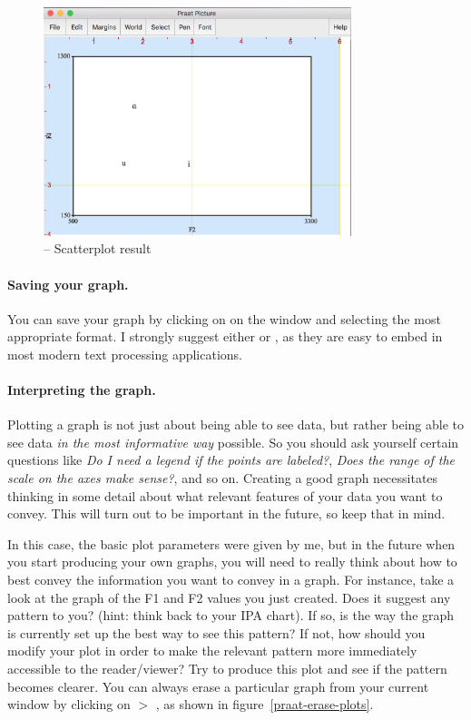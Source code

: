 \begin{figure}[!tbp]
\caption{\Praat{} -- Scatterplot result}
\label{praat-scatterplot-result}
	\begin{center}
		\includegraphics[width=0.8\textwidth]{./figures/Praat-16-Scatterplot-Output}
	\end{center}
\end{figure}

\paragraph{Saving your graph.} You can save your graph by clicking on  on the  window and selecting the most appropriate format. I strongly suggest either  or , as they are easy to embed in most modern text processing applications.

\paragraph{Interpreting the graph.} Plotting a graph is not just about being able to see data, but rather being able to see data \emph{in the most informative way} possible. So you should ask yourself certain questions like \emph{Do I need a legend if the points are labeled?}, \emph{Does the range of the scale on the axes make sense?}, and so on. Creating a good graph necessitates thinking in some detail about what relevant features of your data you want to convey. This will turn out to be important in the future, so keep that in mind.

In this case, the basic plot parameters were given by me, but in the future when you start producing your own graphs, you will need to really think about how to best convey the information you want to convey in a graph. For instance, take a look at the graph of the F1 and F2 values you just created. Does it suggest any pattern to you? (hint: think back to your IPA chart). If so, is the way the graph is currently set up the best way to see this pattern? If not, how should you modify your plot in order to make the relevant pattern more immediately accessible to the reader/viewer? Try to produce this plot and see if the pattern becomes clearer. You can always erase a particular graph from your current  window by clicking on  $>$ , as shown in figure~\ref{praat-erase-plots}.

